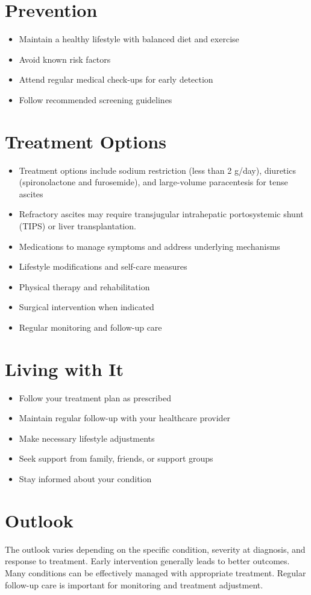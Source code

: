 \section{Prevention}
\begin{itemize}[noitemsep]
  \item Maintain a healthy lifestyle with balanced diet and exercise
  \item Avoid known risk factors
  \item Attend regular medical check-ups for early detection
  \item Follow recommended screening guidelines
\end{itemize}
\section{Treatment Options}
\begin{itemize}[noitemsep]
  \item Treatment options include sodium restriction (less than 2 g/day), diuretics (spironolactone and furosemide), and large-volume paracentesis for tense ascites
  \item Refractory ascites may require transjugular intrahepatic portosystemic shunt (TIPS) or liver transplantation.
  \item Medications to manage symptoms and address underlying mechanisms
  \item Lifestyle modifications and self-care measures
  \item Physical therapy and rehabilitation
  \item Surgical intervention when indicated
  \item Regular monitoring and follow-up care
\end{itemize}
\section{Living with It}
\begin{itemize}[noitemsep]
  \item Follow your treatment plan as prescribed
  \item Maintain regular follow-up with your healthcare provider
  \item Make necessary lifestyle adjustments
  \item Seek support from family, friends, or support groups
  \item Stay informed about your condition
\end{itemize}
\section{Outlook}
The outlook varies depending on the specific condition, severity at diagnosis, and response to treatment. Early intervention generally leads to better outcomes. Many conditions can be effectively managed with appropriate treatment. Regular follow-up care is important for monitoring and treatment adjustment.
